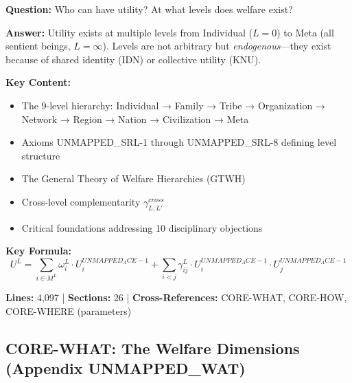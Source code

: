 \begin{tcolorbox}[colback=gray!5!white, colframe=gray!75!black]
\textbf{Question:} Who can have utility? At what levels does welfare exist?

\textbf{Answer:} Utility exists at multiple levels from Individual ($L=0$) to 
Meta (all sentient beings, $L=\infty$). Levels are not arbitrary but \textit{endogenous}---they 
exist because of shared identity (IDN) or collective utility (KNU).

\textbf{Key Content:}
\begin{itemize}[nosep]
\item The 9-level hierarchy: Individual → Family → Tribe → Organization → Network → Region → Nation → Civilization → Meta
\item Axioms UNMAPPED_SRL-1 through UNMAPPED_SRL-8 defining level structure
\item The General Theory of Welfare Hierarchies (GTWH)
\item Cross-level complementarity $\gamma^{cross}_{L,L'}$
\item Critical foundations addressing 10 disciplinary objections
\end{itemize}

\textbf{Key Formula:}
\begin{equation}
U^L = \sum_{i \in M^L} \omega^L_i \cdot U^{UNMAPPED_ACE-1}_i + \sum_{i < j} \gamma^L_{ij} \cdot U^{UNMAPPED_ACE-1}_i \cdot U^{UNMAPPED_ACE-1}_j
\end{equation}

\textbf{Lines:} 4,097 | \textbf{Sections:} 26 | \textbf{Cross-References:} CORE-WHAT, CORE-HOW, CORE-WHERE (parameters)
\end{tcolorbox}

\subsection{CORE-WHAT: The Welfare Dimensions (Appendix UNMAPPED_WAT)}

